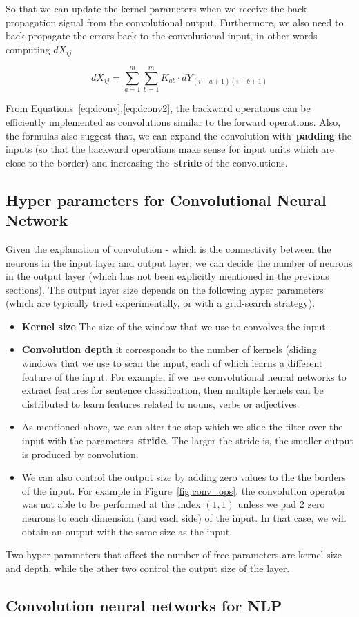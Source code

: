 So that we can update the kernel parameters when we receive the back-propagation signal from the convolutional output. Furthermore, we also need to back-propagate the errors back to the convolutional input, in other words computing $dX_{ij}$

\begin{equation}
dX_{ij} = \sum_{a=1}^{m} \sum_{b=1}^{m} K_{ab} \cdot dY_{(i-a+1)(i-b+1)} 
\label{eq:dconv2}
\end{equation}

From Equations~\ref{eq:dconv},\ref{eq:dconv2}, the backward operations can be efficiently implemented as convolutions similar to the forward operations. Also, the formulas also suggest that, we can expand the convolution with~\textbf{padding} the inputs (so that the backward operations make sense for input units which are close to the border) and increasing the~\textbf{stride} of the convolutions. 

\subsection{Hyper parameters for Convolutional Neural Network}

Given the explanation of convolution - which is the connectivity between the neurons in the input layer and output layer, we can decide the number of neurons in the output layer (which has not been explicitly mentioned in the previous sections). The output layer size depends on the following hyper parameters (which are typically tried experimentally, or with a grid-search strategy). 

\begin{itemize}
	\item \textbf{Kernel size} The size of the window that we use to convolves the input. 
	\item \textbf{Convolution depth} it corresponds to the number of kernels (sliding windows that we use to scan the input, each of which learns a different feature of the input. For example, if we use convolutional neural networks to extract features for sentence classification, then multiple kernels can be distributed to learn features related to nouns, verbs or adjectives. 
	\item As mentioned above, we can alter the step which we slide the filter over the input with the parameters~\textbf{stride}. The larger the stride is, the smaller output is produced by convolution.
	\item We can also control the output size by adding zero values to the the borders of the input. For example in Figure~\ref{fig:conv_ops}, the convolution operator was not able to be performed at the index $(1,1)$ unless we pad 2 zero neurons to each dimension (and each side) of the input. In that case, we will obtain an output with the same size as the input.
\end{itemize}

Two hyper-parameters that affect the number of free parameters are kernel size and depth, while the other two control the output size of the layer. 

\subsection{Convolution neural networks for NLP}







